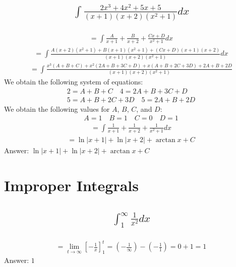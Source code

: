 \documentclass{article}
\begin{document}
\subsection{
	\begin{align*}
		\int{\frac{2x^3 + 4x^2 + 5x + 5}{(x + 1)(x + 2)(x^2 + 1)} dx}
	\end{align*}
}
\begin{align*}
	= \int{\frac{A}{x + 1} + \frac{B}{x + 2} + \frac{Cx + D}{x^2 + 1}dx}
\end{align*}
\begin{align*}
	= \int{\frac{A(x+2)(x^2 + 1) + B(x + 1)(x^2 + 1) + (Cx + D)(x + 1)(x + 2)}{(x + 1)(x + 2)(x^2 + 1)}dx}
\end{align*}
\begin{align*}
	=\int{\frac{x^3(A + B + C) + x^2(2A + B + 3C + D) + x(A + B + 2C + 3D) + 2A + B + 2D}{(x + 1)(x + 2)(x^2 + 1)}}
\end{align*}
We obtain the following system of equations:
\begin{align*}
	2 = A + B + C \quad 4 = 2A + B + 3C + D \\ 5 = A + B +2C+ 3D \quad 5 = 2A + B + 2D
\end{align*}
We obtain the following values for $A$, $B$, $C$, and $D$:
\begin{align*}
	A = 1 \quad B = 1 \quad C = 0 \quad D = 1
\end{align*}
\begin{align*}
	= \int{\frac{1}{x + 1} + \frac{1}{x + 2} + \frac{1}{x^2 + 1}dx}
\end{align*}
\begin{align*}
	= \ln{|x + 1|} + \ln{|x + 2|} + \arctan{x} + C
\end{align*}
Answer: $\ln{|x + 1|} + \ln{|x + 2|} + \arctan{x} + C$

\section{Improper Integrals}
\subsection{
	\begin{align*}
		\int_1^\infty{\frac{1}{x^2} dx}
	\end{align*}
}
\begin{align*}
	= \lim_{t \to \infty} \left[ -\frac{1}{x} \right]_1^t = \left(-\frac{1}{\infty} \right) - \left(-\frac{1}{1} \right) = 0 + 1 = 1
\end{align*}
Answer: $1$
\end{document}
